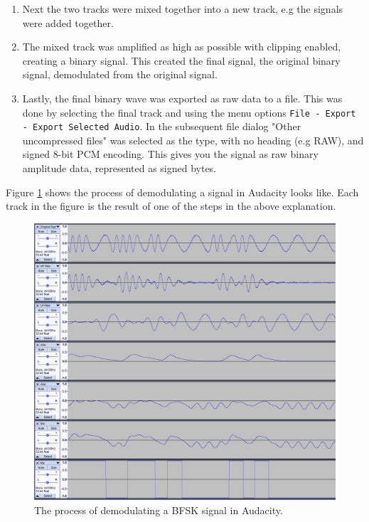 \begin{enumerate}
    \item Next the two tracks were mixed together into a new track, e.g the signals were added together.

    \item The mixed track was amplified as high as possible with clipping enabled, creating a binary signal. This created the final signal, the original binary signal, demodulated from the original signal.
    
    \item Lastly, the final binary wave was exported as raw data to a file. This was done by selecting the final track and using the menu options \texttt{File - Export - Export Selected Audio}. In the subsequent file dialog "Other uncompressed files" was selected as the type, with no heading (e.g RAW), and signed 8-bit PCM encoding. This gives you the signal as raw binary amplitude data, represented as signed bytes.
\end{enumerate}
Figure \ref{fig:audacity-demodulation} shows the process of demodulating a signal in Audacity looks like. Each track in the figure is the result of one of the steps in the above explanation.
\begin{figure}[!ht]
    \centering
    \includegraphics[width=\textwidth]{images/6-pentesting/audacity-demodulation.png}
    \caption{The process of demodulating a BFSK signal in Audacity.}
    \label{fig:audacity-demodulation}
\end{figure}

